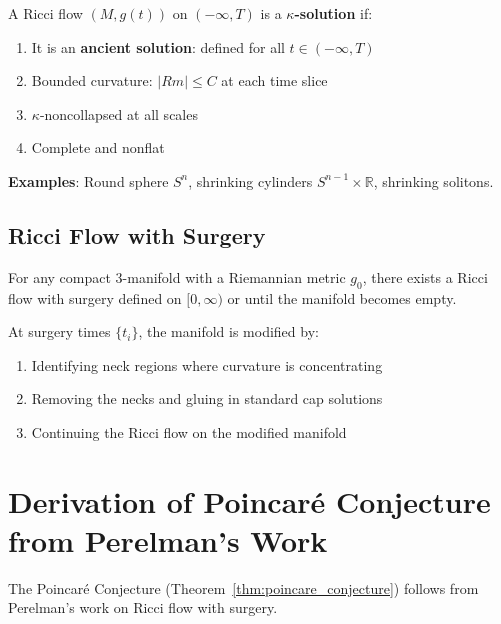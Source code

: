 \begin{definition}
\label{def:kappa_solution}
A Ricci flow $(M, g(t))$ on $(-\infty, T)$ is a \textbf{$\kappa$-solution} if:
\begin{enumerate}
\item It is an \textbf{ancient solution}: defined for all $t \in (-\infty, T)$
\item Bounded curvature: $|Rm| \leq C$ at each time slice
\item $\kappa$-noncollapsed at all scales
\item Complete and nonflat
\end{enumerate}

\textbf{Examples}: Round sphere $S^n$, shrinking cylinders $S^{n-1} \times \mathbb{R}$, shrinking solitons.
\end{definition}

\section{Ricci Flow with Surgery}

\begin{axiom}
\label{ax:ricci_flow_with_surgery}
For any compact 3-manifold with a Riemannian metric $g_0$, there exists a Ricci flow with surgery defined on $[0, \infty)$ or until the manifold becomes empty.

At surgery times $\{t_i\}$, the manifold is modified by:
\begin{enumerate}
\item Identifying neck regions where curvature is concentrating
\item Removing the necks and gluing in standard cap solutions
\item Continuing the Ricci flow on the modified manifold
\end{enumerate}
\end{axiom}

\chapter{Derivation of Poincaré Conjecture from Perelman's Work}
\label{chap:poincare_derivation}

\begin{theorem}
\label{thm:poincare_from_perelman}
The Poincaré Conjecture (Theorem~\ref{thm:poincare_conjecture}) follows from Perelman's work on Ricci flow with surgery.
\end{theorem}

